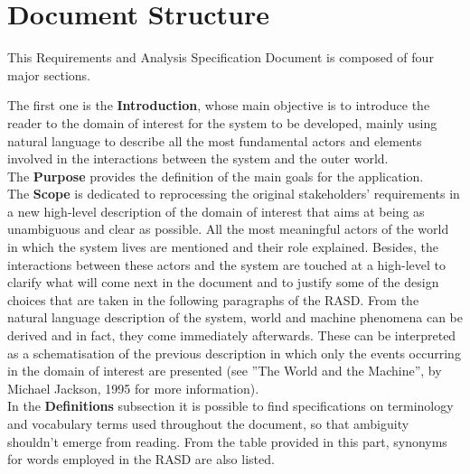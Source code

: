 \newpage
\section{Document Structure}

This Requirements and Analysis Specification Document is composed of four major sections.

The first one is the \textbf{Introduction}, whose main objective is to introduce the reader to the domain
of interest for the system to be developed, mainly using natural language to describe all the most
fundamental actors and elements involved in the interactions between the system and the outer world. \\
The \textbf{Purpose} provides the definition of the main goals for the application. \\
The \textbf{Scope} is dedicated to reprocessing the original stakeholders’ requirements in a new high-level
description of the domain of interest that aims at being as unambiguous and clear as possible. All the
most meaningful actors of the world in which the system lives are mentioned and their role explained.
Besides, the interactions between these actors and the system are touched at a high-level to clarify
what will come next in the document and to justify some of the design choices that are taken in the
following paragraphs of the RASD. From the natural language description of the system, world and
machine phenomena can be derived and in fact, they come immediately afterwards. These can be
interpreted as a schematisation of the previous description in which only the events occurring in the
domain of interest are presented (see ”The World and the Machine”, by Michael Jackson, 1995 for
more information). \\
In the \textbf{Definitions} subsection it is possible to find specifications on terminology and vocabulary terms
used throughout the document, so that ambiguity shouldn’t emerge from reading. From the table
provided in this part, synonyms for words employed in the RASD are also listed.

